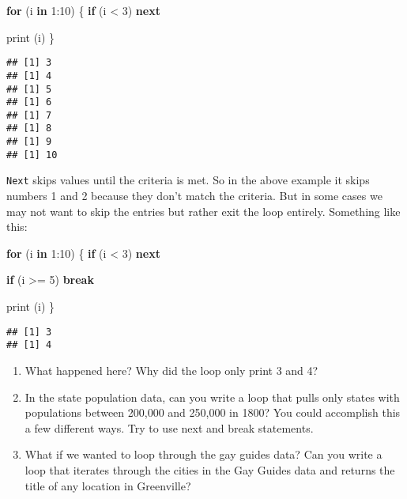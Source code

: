 \documentclass[
]{article}
\newenvironment{Shaded}{\begin{snugshade}}{\end{snugshade}}
\newcommand{\ControlFlowTok}[1]{\textcolor[rgb]{0.13,0.29,0.53}{\textbf{#1}}}
\newcommand{\DecValTok}[1]{\textcolor[rgb]{0.00,0.00,0.81}{#1}}
\newcommand{\FunctionTok}[1]{\textcolor[rgb]{0.00,0.00,0.00}{#1}}
\newcommand{\NormalTok}[1]{#1}
\newcommand{\SpecialCharTok}[1]{\textcolor[rgb]{0.00,0.00,0.00}{#1}}
\begin{document}
\begin{Shaded}
\begin{Highlighting}[]
\ControlFlowTok{for}\NormalTok{ (i }\ControlFlowTok{in} \DecValTok{1}\SpecialCharTok{:}\DecValTok{10}\NormalTok{) \{}
  \ControlFlowTok{if}\NormalTok{ (i }\SpecialCharTok{\textless{}} \DecValTok{3}\NormalTok{)}
    \ControlFlowTok{next}
  
  \FunctionTok{print}\NormalTok{ (i)}
\NormalTok{\}}
\end{Highlighting}
\end{Shaded}

\begin{verbatim}
## [1] 3
## [1] 4
## [1] 5
## [1] 6
## [1] 7
## [1] 8
## [1] 9
## [1] 10
\end{verbatim}

\texttt{Next} skips values until the criteria is met. So in the above
example it skips numbers 1 and 2 because they don't match the criteria.
But in some cases we may not want to skip the entries but rather exit
the loop entirely. Something like this:

\begin{Shaded}
\begin{Highlighting}[]
\ControlFlowTok{for}\NormalTok{ (i }\ControlFlowTok{in} \DecValTok{1}\SpecialCharTok{:}\DecValTok{10}\NormalTok{) \{}
  \ControlFlowTok{if}\NormalTok{ (i }\SpecialCharTok{\textless{}} \DecValTok{3}\NormalTok{)}
    \ControlFlowTok{next}
  
  \ControlFlowTok{if}\NormalTok{ (i }\SpecialCharTok{\textgreater{}=} \DecValTok{5}\NormalTok{)}
    \ControlFlowTok{break}
  
  \FunctionTok{print}\NormalTok{ (i)}
\NormalTok{\}}
\end{Highlighting}
\end{Shaded}

\begin{verbatim}
## [1] 3
## [1] 4
\end{verbatim}

\begin{enumerate}
\def\labelenumi{(\arabic{enumi})}
\setcounter{enumi}{16}
\item
  What happened here? Why did the loop only print 3 and 4?
\item
  In the state population data, can you write a loop that pulls only
  states with populations between 200,000 and 250,000 in 1800? You could
  accomplish this a few different ways. Try to use next and break
  statements.
\item
  What if we wanted to loop through the gay guides data? Can you write a
  loop that iterates through the cities in the Gay Guides data and
  returns the title of any location in Greenville?
\end{enumerate}
\end{document}
